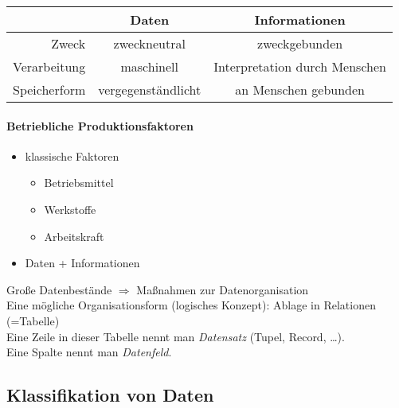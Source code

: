 \begin{tabular}{r | c c}
& Daten & Informationen\\
\hline
Zweck & zweckneutral & zweckgebunden\\
Verarbeitung & maschinell & Interpretation durch Menschen\\
Speicherform & vergegenständlicht & an Menschen gebunden\\
\end{tabular}
\paragraph{Betriebliche Produktionsfaktoren}
\begin{itemize}
\item klassische Faktoren
\begin{itemize}
\item Betriebsmittel
\item Werkstoffe
\item Arbeitskraft
\end{itemize}
\item Daten + Informationen
\end{itemize}

Große Datenbestände $\Rightarrow$ Maßnahmen zur Datenorganisation\bigskip\\
Eine mögliche Organisationsform (logisches Konzept): Ablage in Relationen (=Tabelle)\bigskip\\
Eine Zeile in dieser Tabelle nennt man \emph{Datensatz} (Tupel, Record, …).\\
Eine Spalte nennt man \emph{Datenfeld}.

\subsection{Klassifikation von Daten}
